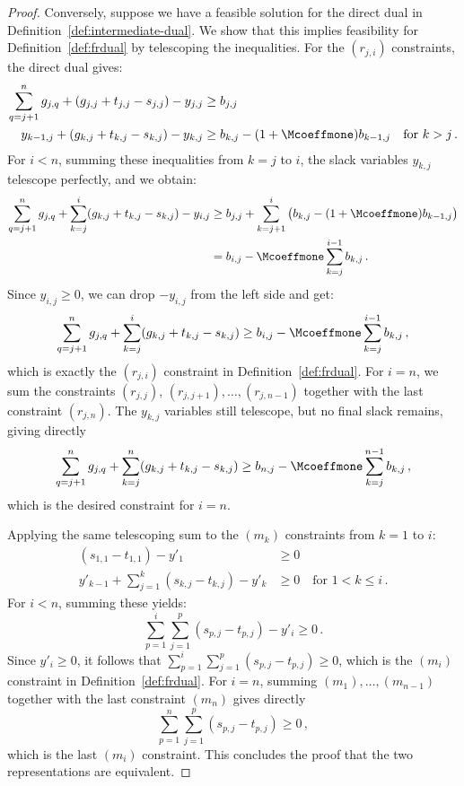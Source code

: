 \begin{proof}
    Conversely, suppose we have a feasible solution for the direct dual in Definition~\ref{def:intermediate-dual}. We show that this implies feasibility for Definition~\ref{def:frdual} by telescoping the inequalities.
    For the $(r_{j,i})$ constraints, the direct dual gives:
    \begin{align*}
        \sum_{q=j+1}^n g_{j,q} + (g_{j,j} + t_{j,j} - s_{j,j}) - y_{j,j} &\geq b_{j,j} \\
        y_{k-1,j} + (g_{k,j} + t_{k,j} - s_{k,j}) - y_{k,j} &\geq b_{k,j} - (1+\Mcoeffmone) b_{k-1,j} \quad \text{for } k > j\,.
    \end{align*}
    For $i<n$, summing these inequalities from $k=j$ to $i$, the slack variables $y_{k,j}$ telescope perfectly, and we obtain:
    \begin{align*}
        \sum_{q=j+1}^n g_{j,q} + \sum_{k=j}^i (g_{k,j} + t_{k,j} - s_{k,j}) - y_{i,j} &\geq b_{j,j} + \sum_{k=j+1}^i \big( b_{k,j} - (1+\Mcoeffmone) b_{k-1,j} \big) \\
        &= b_{i,j} - \Mcoeffmone \sum_{k=j}^{i-1} b_{k,j}\,.
    \end{align*}
    Since $y_{i,j} \geq 0$, we can drop $-y_{i,j}$ from the left side and get:
    \begin{equation*}
        \sum_{q=j+1}^n g_{j,q} + \sum_{k=j}^i (g_{k,j} + t_{k,j} - s_{k,j}) \geq b_{i,j} - \Mcoeffmone \sum_{k=j}^{i-1} b_{k,j}\,,
    \end{equation*}
    which is exactly the $(r_{j,i})$ constraint in Definition~\ref{def:frdual}. For $i=n$, we sum the constraints $(r_{j,j})$, $(r_{j,j+1}), \ldots, (r_{j,n-1})$ together with the last constraint $(r_{j,n})$. The $y_{k,j}$ variables still telescope, but no final slack remains, giving directly
    \begin{equation*}
        \sum_{q=j+1}^n g_{j,q} + \sum_{k=j}^n (g_{k,j} + t_{k,j} - s_{k,j}) \geq b_{n,j} - \Mcoeffmone \sum_{k=j}^{n-1} b_{k,j}\,,
    \end{equation*}
    which is the desired constraint for $i=n$.
    
    Applying the same telescoping sum to the $(m_k)$ constraints from $k=1$ to $i$:
    \begin{align*}
        (s_{1,1} - t_{1,1}) - y'_1 &\ge 0 \\
        y'_{k-1} + \sum_{j=1}^k (s_{k,j} - t_{k,j}) - y'_k &\ge 0 \quad \text{for } 1 < k \le i\,.
    \end{align*}
    For $i<n$, summing these yields:
    \begin{equation*}
        \sum_{p=1}^i \sum_{j=1}^p (s_{p,j} - t_{p,j}) - y'_i \geq 0\,.
    \end{equation*}
    Since $y'_i \geq 0$, it follows that $\sum_{p=1}^i \sum_{j=1}^p (s_{p,j} - t_{p,j}) \geq 0$, which is the $(m_i)$ constraint in Definition~\ref{def:frdual}. For $i=n$, summing $(m_1),\ldots,(m_{n-1})$ together with the last constraint $(m_n)$ gives directly
    \begin{equation*}
        \sum_{p=1}^n \sum_{j=1}^p (s_{p,j} - t_{p,j}) \geq 0\,,
    \end{equation*}
    which is the last $(m_i)$ constraint. This concludes the proof that the two representations are equivalent.


\end{proof}
